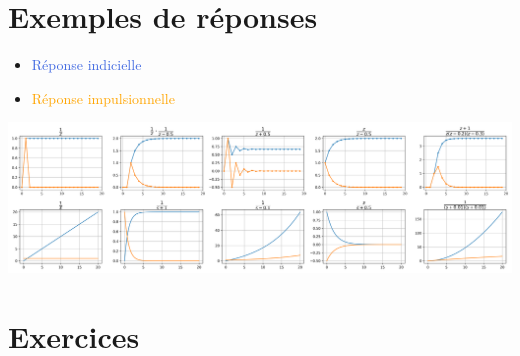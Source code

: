 \documentclass[]{article}
\begin{document}
\begin{multicols}{3}










\end{multicols}
\pagebreak
\section{Exemples de réponses}
\begin{itemize}
\item \textcolor{RoyalBlue}{Réponse indicielle}
\item \textcolor{Orange}{Réponse impulsionnelle}
\end{itemize}
\begin{center}
\includegraphics[width=\textwidth]{Allures.png}
\end{center}
\pagebreak
\section{Exercices}
\end{document}
